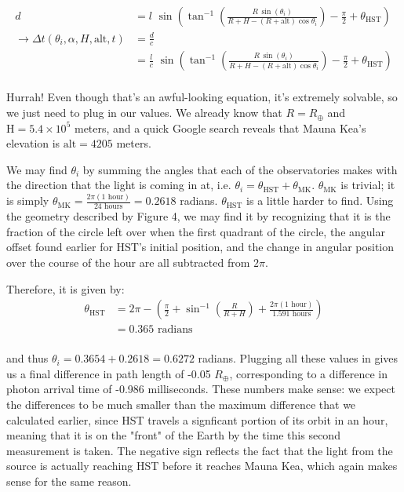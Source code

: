 \documentclass[12pt]{article}
\begin{document}
\begin{onehalfspacing}
\begin{align*}
  d &= l \,\, \sin \left( \tan^{-1} \left(   \frac{R \, \sin(\theta_i)}{R + H - (R + \text{alt}) \cos{\theta_i}} \right) - \frac{\pi}{2} + \theta_{\text{HST}} \right) \\
  \rightarrow \Delta t (\theta_i, \alpha, H, \text{alt}, t) &= \frac{d}{c} \\
                       &= \frac{l}{c} \,\, \sin \left( \tan^{-1} \left(   \frac{R \, \sin(\theta_i)}{R + H - (R + \text{alt}) \cos{\theta_i}} \right) - \frac{\pi}{2} + \theta_{\text{HST}} \right) \\
\end{align*}

Hurrah! Even though that's an awful-looking equation, it's extremely solvable, so we just need to plug in our values. We already know that $R = R_{\oplus}$ and $\text{H} = 5.4 \times 10^5$ meters, and a quick Google search reveals that Mauna Kea's elevation is $\text{alt}=4205$ meters.

\bigskip
\bigskip

We may find $\theta_i$ by summing the angles that each of the observatories makes with the direction that the light is coming in at, i.e. $\theta_i = \theta_{\text{HST}} + \theta_{\text{MK}}$. $\theta_{\text{MK}}$ is trivial; it is simply $\theta_{\text{MK}} = \frac{2 \pi (1 \text{ hour})}{24 \text{ hours}} = 0.2618$ radians. $\theta_{\text{HST}}$ is a little harder to find. Using the geometry described by Figure 4, we may find it by recognizing that it is the fraction of the circle left over when the first quadrant of the circle, the angular offset found  earlier for HST's initial position, and the change in angular position over the course of the hour are all subtracted from $2 \pi$.


Therefore, it is given by:
\begin{align*}
  \theta_{\text{HST}} &= 2 \pi - \left(\frac{\pi}{2} + \sin^{-1} \left( \frac{R}{R + H}\right) + \frac{2 \pi (1 \text{ hour})}{1.591 \text{ hours}} \right) \\
                      &= 0.365 \text{ radians} \\
\end{align*}

and thus $\theta_i = 0.3654 + 0.2618 = 0.6272$ radians. Plugging all these values in gives us a final difference in path length of -0.05 $R_{\oplus}$, corresponding to a difference in photon arrival time of -0.986 milliseconds. These numbers make sense: we expect the differences to be much smaller than the maximum difference that we calculated earlier, since HST travels a signficant portion of its orbit in an hour, meaning that it is on the "front" of the Earth by the time this second measurement is taken. The negative sign reflects the fact that the light from the source is actually reaching HST before it reaches Mauna Kea, which again makes sense for the same reason.











\end{onehalfspacing}
\end{document}
